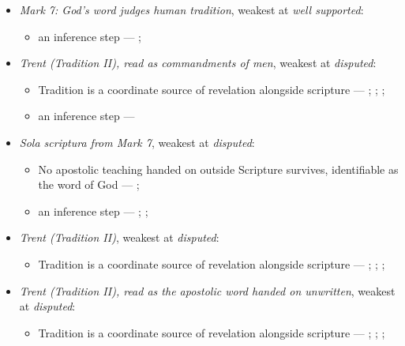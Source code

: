 \documentclass[11pt]{article}
\begin{document}
\begin{itemize}
\item \emph{Mark 7: God's word judges human tradition}, weakest at \emph{well supported}:
\begin{itemize}
\item an inference step --- \cite[Vatican II (1965), Dei Verbum 10]{tanner-decrees-1990}; \cite[IV.x.23]{calvin-institutes-1960}
\end{itemize}
\item \emph{Trent (Tradition II), read as commandments of men}, weakest at \emph{disputed}:
\begin{itemize}
\item Tradition is a coordinate source of revelation alongside scripture --- \cite[Trent, Session IV (1546), Decree on Sacred Books and Traditions]{tanner-decrees-1990}; \cite{mathison-shape-sola-scriptura-2001}; \cite{geiselmann-meaning-of-tradition-1966}; \cite{congar-tradition-and-traditions-1966}
\item an inference step --- \cite[IV.x.23]{calvin-institutes-1960}
\end{itemize}
\item \emph{Sola scriptura from Mark 7}, weakest at \emph{disputed}:
\begin{itemize}
\item No apostolic teaching handed on outside Scripture survives, identifiable as the word of God --- \cite[506]{whitaker-disputation-1849}; \cite[I.6]{westminster-confession-1647}
\item an inference step --- \cite{geiselmann-meaning-of-tradition-1966}; \cite[Vatican I (1870), Pastor Aeternus, ch. 4]{tanner-decrees-1990}; \cite{florovsky-bible-church-tradition-1972}
\end{itemize}
\item \emph{Trent (Tradition II)}, weakest at \emph{disputed}:
\begin{itemize}
\item Tradition is a coordinate source of revelation alongside scripture --- \cite[Trent, Session IV (1546), Decree on Sacred Books and Traditions]{tanner-decrees-1990}; \cite{mathison-shape-sola-scriptura-2001}; \cite{geiselmann-meaning-of-tradition-1966}; \cite{congar-tradition-and-traditions-1966}
\end{itemize}
\item \emph{Trent (Tradition II), read as the apostolic word handed on unwritten}, weakest at \emph{disputed}:
\begin{itemize}
\item Tradition is a coordinate source of revelation alongside scripture --- \cite[Trent, Session IV (1546), Decree on Sacred Books and Traditions]{tanner-decrees-1990}; \cite{mathison-shape-sola-scriptura-2001}; \cite{geiselmann-meaning-of-tradition-1966}; \cite{congar-tradition-and-traditions-1966}
\end{itemize}
\end{itemize}
\end{document}
